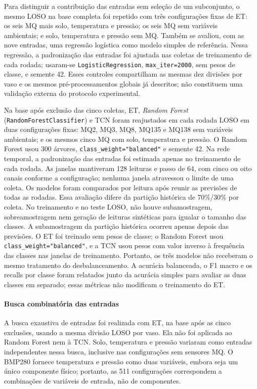 Para distinguir a contribuição das entradas sem seleção de
um subconjunto, o mesmo LOSO na base completa foi repetido com três
configurações fixas de ET: os seis MQ mais solo, temperatura e pressão;
os seis MQ sem variáveis ambientais; e solo, temperatura e pressão sem MQ. Também se
avaliou, com as nove entradas, uma regressão logística como modelo
simples de referência. Nessa regressão, a padronização das entradas foi
ajustada nas coletas de treinamento de cada rodada; usaram-se
\texttt{LogisticRegression}, \texttt{max\_iter=2000}, sem pesos de classe,
e semente 42. Esses controles compartilham as mesmas dez divisões por
vaso e os mesmos pré-processamentos globais já descritos; não constituem
uma validação externa do protocolo experimental.

Na base após exclusão das cinco coletas, ET, \textit{Random Forest}
(\texttt{RandomForestClassifier}) e TCN foram reajustados em cada rodada
LOSO em duas configurações fixas: MQ2, MQ3, MQ8, MQ135 e MQ138 sem variáveis
ambientais; e os mesmos cinco MQ com solo, temperatura e pressão. O Random Forest usou 300
árvores, \texttt{class\_weight="balanced"} e semente 42. Na rede temporal,
a padronização das entradas foi estimada apenas no treinamento de cada
rodada. As janelas mantiveram 128 leituras e passo de 64, com cinco ou oito
canais conforme a configuração; nenhuma janela atravessou o limite de
uma coleta.
Os modelos foram comparados por leitura após reunir as previsões de todas
as rodadas. Essa avaliação difere da partição histórica de 70\%/30\% por coleta.
No treinamento e no teste LOSO, não houve
subamostragem, sobreamostragem nem geração de leituras sintéticas para
igualar o tamanho das classes. A subamostragem da partição histórica
ocorreu apenas depois das previsões. O ET
foi treinado sem pesos de classe; o Random Forest usou
\texttt{class\_weight="balanced"}, e a TCN usou pesos com valor inverso
à frequência das classes nas janelas de treinamento.
Portanto, os três modelos não receberam o mesmo tratamento do
desbalanceamento. A acurácia balanceada, o F1 macro e os recalls por
classe foram relatados junto da acurácia simples para avaliar as duas
classes em separado; essas métricas não modificam o treinamento do ET.

\paragraph{Busca combinatória das entradas}
\label{subsec:busca_combinatoria_loso}

A busca exaustiva de entradas foi realizada com ET, na base após
as cinco exclusões, usando a mesma divisão LOSO por vaso. Ela não foi
aplicada ao Random Forest nem à TCN.
Solo, temperatura e pressão variaram como entradas independentes nessa busca,
inclusive nas configurações sem sensores MQ. O BMP280 fornece
temperatura e pressão como duas variáveis, embora seja um único componente
físico; portanto, as 511 configurações correspondem a combinações de
variáveis de entrada, não de componentes.


